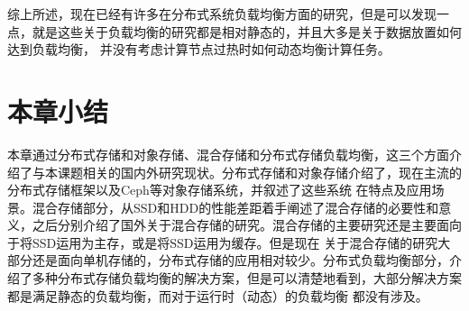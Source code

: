 综上所述，现在已经有许多在分布式系统负载均衡方面的研究，但是可以发现一点，就是这些关于负载均衡的研究都是相对静态的，并且大多是关于数据放置如何达到负载均衡，
并没有考虑计算节点过热时如何动态均衡计算任务。

\section{本章小结}
本章通过分布式存储和对象存储、混合存储和分布式存储负载均衡，这三个方面介绍了与本课题相关的国内外研究现状。分布式存储和对象存储介绍了，现在主流的分布式存储框架以及Ceph等对象存储系统，并叙述了这些系统
在特点及应用场景。混合存储部分，从SSD和HDD的性能差距着手阐述了混合存储的必要性和意义，之后分别介绍了国外关于混合存储的研究。混合存储的主要研究还是主要面向于将SSD运用为主存，或是将SSD运用为缓存。但是现在
关于混合存储的研究大部分还是面向单机存储的，分布式存储的应用相对较少。分布式负载均衡部分，介绍了多种分布式存储负载均衡的解决方案，但是可以清楚地看到，大部分解决方案都是满足静态的负载均衡，而对于运行时（动态）的负载均衡
都没有涉及。